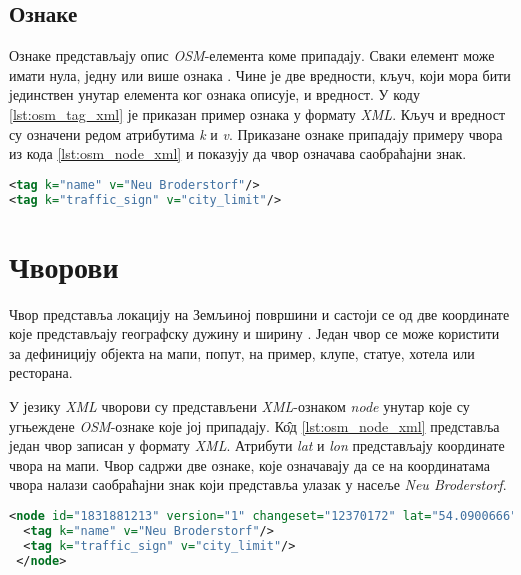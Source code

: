 \documentclass[12pt,oneside]{memoir}
\begin{document}
\subsection{Ознаке}
\label{subsec:osm_tags}

Ознаке представљају опис \textit{OSM}-елемента коме припадају. Сваки елемент може имати нула, једну или више ознака \cite{osm_wiki}. Чине је две вредности, кључ, који мора бити јединствен унутар елемента ког ознака описује, и вредност. У коду \ref{lst:osm_tag_xml} је приказан пример ознака у формату \textit{XML}. Кључ и вредност су означени редом атрибутима \textit{k} и \textit{v}. Приказане ознаке припадају примеру чвора из кода \ref{lst:osm_node_xml} и показују да чвор означава саобраћајни знак.

\begin{lstlisting}[language=XML, caption={Пример \textit{OSM}-ознака у формату \textit{XML}}, label={lst:osm_tag_xml}]
<tag k="name" v="Neu Broderstorf"/>
<tag k="traffic_sign" v="city_limit"/>
\end{lstlisting}

\section{Чворови}
\label{sec:osm_nodes}

Чвор представља локацију на Земљиној површини и састоји се од две координате које представљају географску дужину и ширину \cite{osm_wiki}. Један чвор се може користити за дефиницију објекта на мапи, попут, на пример, клупе, статуе, хотела или ресторана.

У језику \textit{XML} чворови су представљени \textit{XML}-ознаком \textit{node} унутар које су угњеждене \textit{OSM}-ознаке које јој припадају. К\^{о}д \ref{lst:osm_node_xml} представља један чвор записан у формату \textit{XML}. Атрибути \textit{lat} и \textit{lon} представљају координате чвора на мапи. Чвор садржи две ознаке, које означавају да се на координатама чвора налази саобраћајни знак који представља улазак у насеље \textit{Neu Broderstorf}.

\begin{lstlisting}[language=XML, caption={Запис \textit{XML} \textit{OSM}-чвора који представља саобраћајни знак}, label={lst:osm_node_xml}]
<node id="1831881213" version="1" changeset="12370172" lat="54.0900666" lon="12.2539381" user="lafkor" uid="75625" visible="true" timestamp="2012-07-20T09:43:19Z">
  <tag k="name" v="Neu Broderstorf"/>
  <tag k="traffic_sign" v="city_limit"/>
 </node>
\end{lstlisting}
\end{document}
